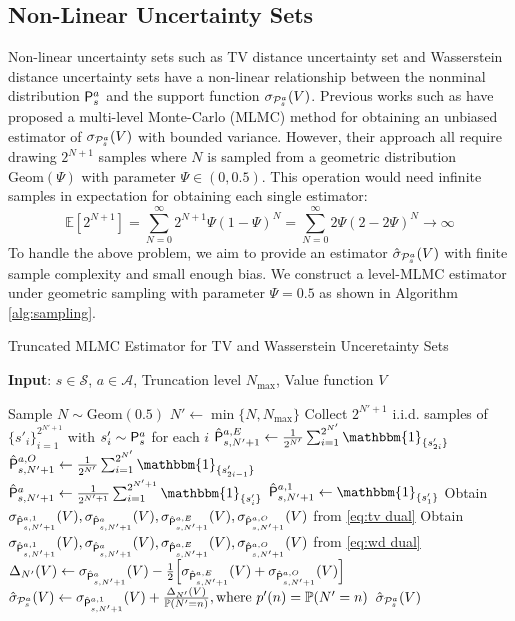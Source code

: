 \subsection{Non-Linear Uncertainty Sets}
Non-linear uncertainty sets such as TV distance uncertainty set and Wasserstein distance uncertainty sets have a non-linear relationship between the nonminal distribution $\mathsf P^a_s$ and the support function ${\sigma}_{\mathcal{P}^a_s}(V)$. Previous works such as \citep{blanchet2015unbiased,blanchet2019unbiased, wang2023model} have proposed a multi-level Monte-Carlo (MLMC) method for obtaining an unbiased estimator  of ${\sigma}_{\mathcal{P}^a_s}(V)$ with bounded variance. However, their approach all require drawing $2^{N+1}$ samples where $N$ is sampled from a geometric distribution $\mathrm{Geom}(\Psi)$ with parameter $\Psi \in (0,0.5)$. This operation would need infinite samples in expectation for obtaining each single estimator:
\begin{equation}
    \mathbb{E}[2^{N+1}] = \sum^{\infty}_{N=0} 2^{N+1} \Psi(1-\Psi)^N  = \sum^{\infty}_{N=0} 2\Psi(2-2\Psi)^N \rightarrow \infty
\end{equation}
To handle the above problem, we aim to provide an estimator $\hat{\sigma}_{\mathcal{P}^a_s}(V)$ with finite sample complexity and small enough bias. We construct a level-MLMC estimator under geometric sampling with parameter $\Psi=0.5$ as shown in Algorithm \ref{alg:sampling}.

\begin{algorithm}[htb]
\caption{Truncated MLMC Estimator for TV and Wasserstein Unceretainty Sets}
\label{alg:sampling}
\textbf{Input}: $s\in \mathcal{S}$, $a\in\mathcal{A}$,  Truncation level $N_{\max}$, Value function $V$
\begin{algorithmic}[1] 
\State Sample $N \sim \mathrm{Geom}(0.5)$
\State $N' \leftarrow \min \{N, N_{\max}\}$
\State Collect $2^{N'+1}$ i.i.d. samples of $\{s'_i\}^{2^{N'+1}}_{i=1}$ with $s'_i \sim \mathsf P^a_s$ for each $i$
\State $\hat{\kp}^{a,E}_{s,N'+1} \leftarrow \frac{1}{2^{N'}}\sum_{i=1}^{2^{N'}} \mathbbm{1}_{\{s'_{2i}\}}$
\State $\hat{\kp}^{a,O}_{s,N'+1} \leftarrow \frac{1}{2^{N'}}\sum_{i=1}^{2^{N'}} \mathbbm{1}_{\{s'_{2i-1}\}}$
\State $\hat{\kp}^{a}_{s,N'+1}\leftarrow\frac{1}{2^{N'+1}}\sum_{i=1}^{2^{N'+1}} \mathbbm{1}_{\{s'_i\}}$
\State $\hat{\kp}^{a,1}_{s,N'+1} \leftarrow \mathbbm{1}_{\{s'_1\}}$
 Obtain $\sigma_{\hat{\mathsf P}^{a,1}_{s,N'+1}}(V), \sigma_{\hat{\mathsf P}^{a}_{s,N'+1}}(V), \sigma_{\hat{\mathsf P}^{a,E}_{s,N'+1}}(V), \sigma_{\hat{\mathsf P}^{a,O}_{s,N'+1}}(V)$ from \eqref{eq:tv dual}
 Obtain $\sigma_{\hat{\mathsf P}^{a,1}_{s,N'+1}}(V), \sigma_{\hat{\mathsf P}^{a}_{s,N'+1}}(V), \sigma_{\hat{\mathsf P}^{a,E}_{s,N'+1}}(V), \sigma_{\hat{\mathsf P}^{a,O}_{s,N'+1}}(V)$ from \eqref{eq:wd dual}
\EndIf
\State $\Delta_{N'}(V)\leftarrow \sigma_{\hat{\mathsf P}^{a}_{s,N'+1}}(V)-\frac{1}{2}\Bigl[ \sigma_{\hat{\mathsf P}^{a,E}_{s,N'+1}}(V)+  \sigma_{\hat{\mathsf P}^{a,O}_{s,N'+1}}(V)
\Bigr]$
\State $\hat{\sigma}_{\mathcal{P}^a_s}(V)\leftarrow\sigma_{\hat{\mathsf P}^{a,1}_{s,N'+1}}(V)+\frac{\Delta_{N'}(V)}{  \mathbb{P}(N' = n) },
\text{where }
p'(n) = \mathbb{P}(N' = n)$
\Return $\hat{\sigma}_{\mathcal{P}^a_s}(V)$
\end{algorithmic}
\end{algorithm}


